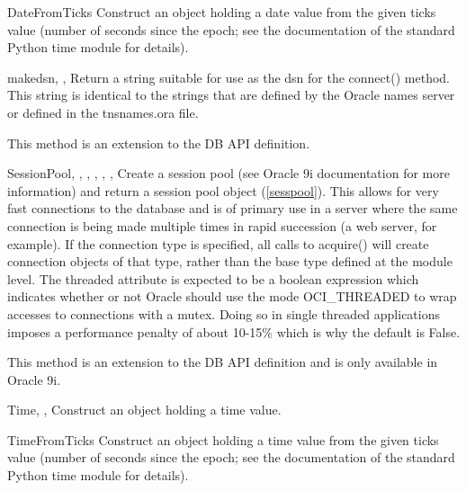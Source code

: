 \documentclass{manual}
\begin{document}
\begin{funcdesc}{DateFromTicks}{}
  Construct an object holding a date value from the given ticks value (number
  of seconds since the epoch; see the documentation of the standard Python
  time module for details).
\end{funcdesc}

\begin{funcdesc}{makedsn}{, , }
  Return a string suitable for use as the dsn for the connect() method. This
  string is identical to the strings that are defined by the Oracle names
  server or defined in the tnsnames.ora file.

   This method is an extension to the DB API definition.
\end{funcdesc}

\begin{funcdesc}{SessionPool}{, , ,
        , , , }
  Create a session pool (see Oracle 9i documentation for more information)
  and return a session pool object (\ref{sesspool}). This allows for very
  fast connections to the database and is of primary use in a server where
  the same connection is being made multiple times in rapid succession (a
  web server, for example). If the connection type is specified, all calls to
  acquire() will create connection objects of that type, rather than the base
  type defined at the module level. The threaded attribute is expected to be a
  boolean expression which indicates whether or not Oracle should use the mode
  OCI_THREADED to wrap accesses to connections with a mutex. Doing so in single
  threaded applications imposes a performance penalty of about 10-15\% which is
  why the default is False.

   This method is an extension to the DB API definition and is
  only available in Oracle 9i.
\end{funcdesc}

\begin{funcdesc}{Time}{, , }
  Construct an object holding a time value.
\end{funcdesc}

\begin{funcdesc}{TimeFromTicks}{}
  Construct an object holding a time value from the given ticks value (number
  of seconds since the epoch; see the documentation of the standard Python
  time module for details).
\end{funcdesc}
\end{document}
